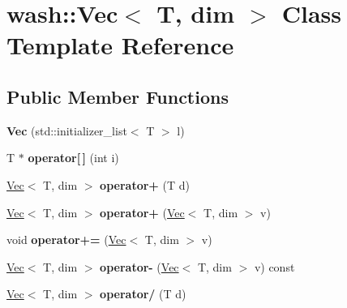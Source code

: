 \hypertarget{classwash_1_1Vec}{}\section{wash\+:\+:Vec$<$ T, dim $>$ Class Template Reference}
\label{classwash_1_1Vec}
\subsection*{Public Member Functions}
\begin{DoxyCompactItemize}
\item 
\mbox{\label{classwash_1_1Vec_a6250ba5f027e9e0e974654136ea7e6ef}} 
{\bfseries Vec} (std\+::initializer\+\_\+list$<$ T $>$ l)
\item 
\mbox{\label{classwash_1_1Vec_a5927d6caa8489a88b8470fe8bb8779d0}} 
T $\ast$ {\bfseries operator\mbox{[}$\,$\mbox{]}} (int i)
\item 
\mbox{\label{classwash_1_1Vec_ad8a8863138b26c2b2eae41e11f40e78f}} 
\mbox{\hyperlink{classwash_1_1Vec}{Vec}}$<$ T, dim $>$ {\bfseries operator+} (T d)
\item 
\mbox{\label{classwash_1_1Vec_a951a842c43b3cf99d60abfe73e53475c}} 
\mbox{\hyperlink{classwash_1_1Vec}{Vec}}$<$ T, dim $>$ {\bfseries operator+} (\mbox{\hyperlink{classwash_1_1Vec}{Vec}}$<$ T, dim $>$ v)
\item 
\mbox{\label{classwash_1_1Vec_ac92d90da0a36cdd6b38a8a12e341fa84}} 
void {\bfseries operator+=} (\mbox{\hyperlink{classwash_1_1Vec}{Vec}}$<$ T, dim $>$ v)
\item 
\mbox{\label{classwash_1_1Vec_a83a86542f9afb7ea0b5b7b8ab72eb119}} 
\mbox{\hyperlink{classwash_1_1Vec}{Vec}}$<$ T, dim $>$ {\bfseries operator-\/} (\mbox{\hyperlink{classwash_1_1Vec}{Vec}}$<$ T, dim $>$ v) const
\item 
\mbox{\label{classwash_1_1Vec_a972cde51776de1a9efec7ed6ea02f401}} 
\mbox{\hyperlink{classwash_1_1Vec}{Vec}}$<$ T, dim $>$ {\bfseries operator/} (T d)
\item 
\mbox{\label{classwash_1_1Vec_a6fc9e30b352c72c7307bd28ee6c0aa72}} 

\end{DoxyCompactItemize}
